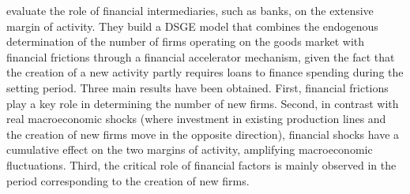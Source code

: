 \documentclass[11pt,a4paper]{article}
\begin{document}
	\cite{poutineau2015financial} evaluate the role of financial intermediaries, such as banks, on the extensive margin of activity. They build a DSGE model that combines the endogenous determination of the number of firms operating on the goods market with financial frictions through a financial accelerator mechanism, given the fact that the creation of a new activity partly requires loans to finance spending during the setting period. Three main results have been obtained. First, financial frictions play a key role in determining the number of new firms. Second, in contrast with real macroeconomic shocks (where investment in existing production lines and the creation of new firms move in the opposite direction), financial shocks have a cumulative effect on the two margins of activity, amplifying macroeconomic fluctuations. Third, the critical role of financial factors is mainly observed in the period corresponding to the creation of new firms.
	
\end{document}
